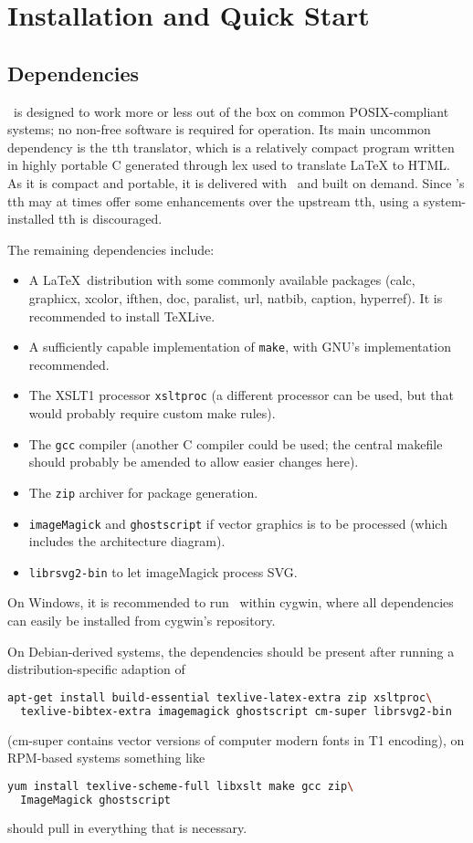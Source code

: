 \documentclass[11pt,a4paper]{ivoa}
\begin{document}
\section{Installation and Quick Start}
\label{sect:quick}

\subsection{Dependencies}

\ivoatex\ is designed to work more or less out of the box on common
POSIX-compliant systems; no non-free software is required for operation.
Its main uncommon dependency is the tth translator, which is a relatively 
compact program
written in highly portable C generated through lex used to translate LaTeX
to HTML.  As it is compact and portable, it is delivered with
\ivoatex~and built on demand.
Since \ivoatex's tth may at times offer
some enhancements over the upstream tth, using a system-installed tth is
discouraged.

The remaining dependencies include:

\begin{itemize}
\item A \LaTeX\ distribution with some commonly available packages (calc,
graphicx, xcolor, ifthen, doc, paralist, url, natbib, caption,
hyperref).
It is recommended to install TeXLive.
\item A sufficiently capable implementation of \texttt{make}, with GNU's
implementation recommended.
\item The XSLT1 processor \texttt{xsltproc} (a different processor can
be used, but that would probably require custom make rules).
\item The \texttt{gcc} compiler (another C compiler could be used; the
central makefile should probably be amended to allow easier changes
here).
\item The \texttt{zip} archiver for package generation.
\item \texttt{imageMagick} and \texttt{ghostscript} if vector graphics
is to be processed (which includes the architecture diagram).
\item \texttt{librsvg2-bin} to let imageMagick process SVG.
\end{itemize}

On Windows, it is recommended to run \ivoatex\ within cygwin, where all
dependencies can easily be installed from cygwin's repository.  

On
Debian-derived systems, the dependencies should be present after
running a distribution-specific adaption of
\begin{lstlisting}[language=sh,basicstyle=\footnotesize]
apt-get install build-essential texlive-latex-extra zip xsltproc\
  texlive-bibtex-extra imagemagick ghostscript cm-super librsvg2-bin
\end{lstlisting}
(cm-super contains vector versions of computer modern fonts in T1
encoding), on RPM-based systems something like
\begin{lstlisting}[language=sh]
yum install texlive-scheme-full libxslt make gcc zip\
  ImageMagick ghostscript
\end{lstlisting}
should pull in everything that is necessary.
\end{document}
